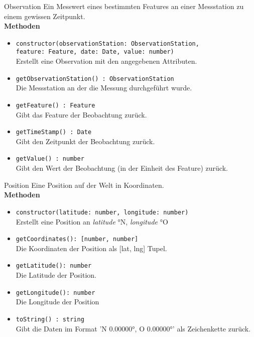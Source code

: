     \begin{Class}{Observation}
        Ein Messwert eines bestimmten Features an einer Messstation zu einem gewissen Zeitpunkt.
        \bigskip\\
        \textbf{Methoden}
        \begin{itemize}
            \item \texttt{constructor(observationStation: ObservationStation, 
            \\feature: Feature, date: Date, value: number)}
            \\ Erstellt eine Observation mit den angegebenen Attributen.
            \item \texttt{getObservationStation() : ObservationStation}
            \\ Die Messstation an der die Messung durchgeführt wurde.
            \item \texttt{getFeature() : Feature}
            \\ Gibt das Feature der Beobachtung zurück.
            \item \texttt{getTimeStamp() : Date}
            \\ Gibt den Zeitpunkt der Beobachtung zurück.
            \item \texttt{getValue() : number}
            \\ Gibt den Wert der Beobachtung (in der Einheit des Feature) zurück.
        \end{itemize}
    \end{Class}

    \begin{Class}{Position}
        Eine Position auf der Welt in Koordinaten.
        \bigskip\\
        \textbf{Methoden}
        \begin{itemize}
            \item \texttt{constructor(latitude: number, longitude: number)}
            \\ Erstellt eine Position an \emph{latitude} °N, \emph{longitude} °O
            \item \texttt{getCoordinates(): [number, number]}
            \\ Die Koordinaten der Position als [lat, lng] Tupel.
            \item \texttt{getLatitude(): number}
            \\ Die Latitude der Position.
            \item \texttt{getLongitude(): number}
            \\ Die Longitude der Position
            \item \texttt{toString() : string}
            \\ Gibt die Daten im Format 'N 0.00000°, O 0.00000°' als Zeichenkette zurück.
        \end{itemize}
    \end{Class}

